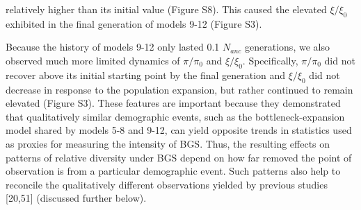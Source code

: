 \documentclass[9pt,twocolumn,twoside]{rilabRxiv}
\begin{document}


relatively higher than its initial value (Figure S8). This caused the
elevated $\xi/\xi_0$ exhibited in the final generation of
models 9-12 (Figure S3).

Because the history of models 9-12 only lasted 0.1
$N_{anc}$ generations, we also observed much more
limited dynamics of $\pi/\pi_0$ and $\xi/\xi_0$.
Specifically, $\pi/\pi_0$ did not recover above its initial
starting point by the final generation and $\xi/\xi_0$ did not
decrease in response to the population expansion, but rather continued
to remain elevated (Figure S3). These features are important because
they demonstrated that qualitatively similar demographic events, such as
the bottleneck-expansion model shared by models 5-8 and 9-12, can yield
opposite trends in statistics used as proxies for measuring the
intensity of BGS. Thus, the resulting effects on patterns of relative
diversity under BGS depend on how far removed the point of observation
is from a particular demographic event. Such patterns also help to
reconcile the qualitatively different observations yielded by previous
studies [20,51] (discussed further below).
\end{document}
